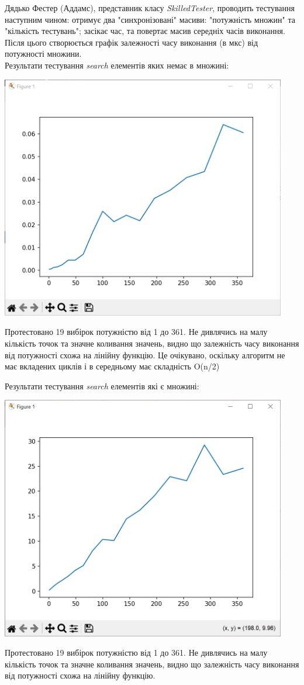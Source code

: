 \documentclass{article}
\begin{document}
Дядько Фестер (Аддамс), представник класу \textit{SkilledTester}, проводить тестування наступним чином: отримує два "синхронізовані" масиви: "потужність множин" та "кількість тестувань"; засікає час, та повертає масив середніх часів виконання. Після цього створюється графік залежності часу виконання (в мкс) від потужності множини.\\\indent
Результати тестування \textit{search} елементів яких немає в множині:
\begin{center}
    \includegraphics[width=125mm]{search}
\end{center}

Протестовано 19 вибірок потужністю від 1 до 361. Не дивлячись на малу кількість точок та значне коливання значень, видно що залежність часу виконання від потужності схожа на лінійну функцію. Це очікувано, оскільку алгоритм не має вкладених циклів і в середньому має складність O(n/2)\\\indent

Результати тестування \textit{search} елементів які є множині:\\\indent

\begin{center}
    \includegraphics[width=125mm]{search_for_element}
\end{center}

Протестовано 19 вибірок потужністю від 1 до 361. Не дивлячись на малу кількість точок та значне коливання значень, видно що залежність часу виконання від потужності схожа на лінійну функцію.\\\indent
\end{document}
